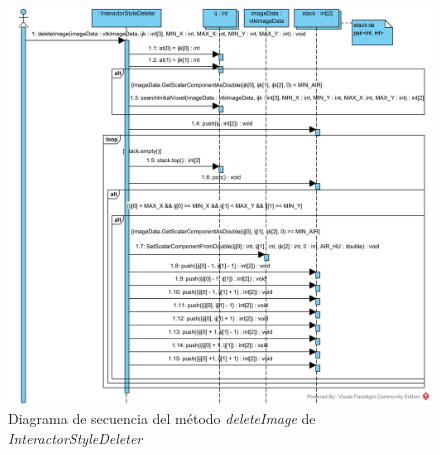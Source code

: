 \begin{figure}[H]
	\centering
	\includegraphics[width=12cm]{imagenes/diagramas/secuencia/InteractorStyleDeleter_DeleteImage}
	\caption{Diagrama de secuencia del método \textit{deleteImage} de \textit{InteractorStyleDeleter}}
	\label{fig:diagrama_secuencia_interactorstyledeleter_deleteimage}
\end{figure}

